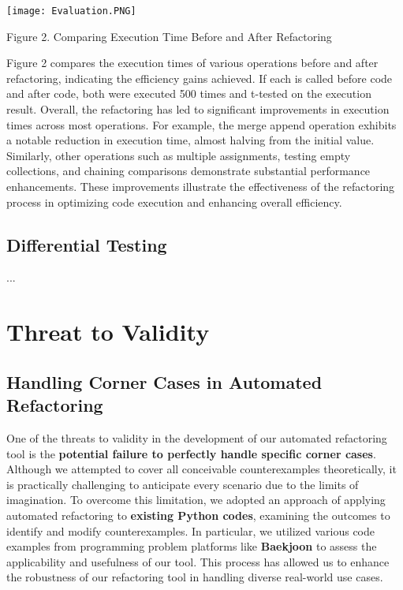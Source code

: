 \documentclass[11pt]{article}
\begin{document}
\begin{center}
\texttt{[image: Evaluation.PNG]}

{Figure 2. Comparing Execution Time Before and After Refactoring}
\end{center}

Figure 2 compares the execution times of various operations before and after refactoring, indicating the efficiency gains achieved. If each is called before code and after code, both were executed 500 times and t-tested on the execution result. Overall, the refactoring has led to significant improvements in execution times across most operations. For example, the merge append operation exhibits a notable reduction in execution time, almost halving from the initial value. Similarly, other operations such as multiple assignments, testing empty collections, and chaining comparisons demonstrate substantial performance enhancements. These improvements illustrate the effectiveness of the refactoring process in optimizing code execution and enhancing overall efficiency.

\subsection{Differential Testing}
...\\

\section{Threat to Validity}
\subsection{Handling Corner Cases in Automated Refactoring}
One of the threats to validity in the development of our automated refactoring tool is the \textbf{potential failure to perfectly handle specific corner cases}. Although we attempted to cover all conceivable counterexamples theoretically, it is practically challenging to anticipate every scenario due to the limits of imagination. To overcome this limitation, we adopted an approach of applying automated refactoring to \textbf{existing Python codes}, examining the outcomes to identify and modify counterexamples. In particular, we utilized various code examples from programming problem platforms like \textbf{Baekjoon} to assess the applicability and usefulness of our tool. This process has allowed us to enhance the robustness of our refactoring tool in handling diverse real-world use cases.\\
\end{document}
